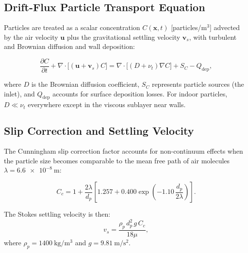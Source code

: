 \documentclass[12pt]{article}
\begin{document}
\subsection{Drift-Flux Particle Transport Equation}

Particles are treated as a scalar concentration $C(\mathbf{x}, t)$ [particles/m$^3$] advected by the air velocity $\mathbf{u}$ plus the gravitational settling velocity $\mathbf{v}_s$, with turbulent and Brownian diffusion and wall deposition:

\begin{equation}
    \frac{\partial C}{\partial t} + \nabla \cdot \bigl[ (\mathbf{u} + \mathbf{v}_s) C \bigr] = \nabla \cdot \bigl[ (D + \nu_t) \nabla C \bigr] + S_C - Q_\text{dep}, \label{eq:transport}
\end{equation}

where $D$ is the Brownian diffusion coefficient, $S_C$ represents particle sources (the inlet), and $Q_\text{dep}$ accounts for surface deposition losses. For indoor particles, $D \ll \nu_t$ everywhere except in the viscous sublayer near walls.

\subsection{Slip Correction and Settling Velocity}

The Cunningham slip correction factor accounts for non-continuum effects when the particle size becomes comparable to the mean free path of air molecules $\lambda = \SI{6.6e-8}{\meter}$:

\begin{equation}
    C_c = 1 + \frac{2\lambda}{d_p} \left[ 1.257 + 0.400 \exp\!\left(-1.10 \, \frac{d_p}{2\lambda}\right) \right]. \label{eq:cunningham}
\end{equation}

The Stokes settling velocity is then:
\begin{equation}
    v_s = \frac{\rho_p \, d_p^2 \, g \, C_c}{18 \mu}, \label{eq:settling}
\end{equation}
where $\rho_p = \SI{1400}{\kilo\gram\per\meter\cubed}$ and $g = \SI{9.81}{\meter\per\second\squared}$.
\end{document}
